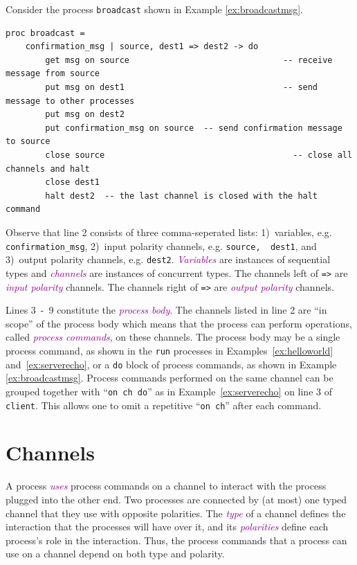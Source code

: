 \documentclass[11pt]{article}
\newcommand{\tc}[1]{\textcolor{darkMagenta}{\textit{#1}}}
\begin{document}
Consider the process \lstinline$broadcast$ shown in Example \ref{ex:broadcastmsg}.
\begin{lstlisting}[label=ex:broadcastmsg, caption=Process that broadcasts a message from a single source] 
proc broadcast =
	confirmation_msg | source, dest1 => dest2 -> do
		get msg on source								-- receive message from source
		put msg on dest1								-- send message to other processes
		put msg on dest2
		put confirmation_msg on source	-- send confirmation message to source
		close source									  -- close all channels and halt
		close dest1
		halt dest2  -- the last channel is closed with the halt command
\end{lstlisting}
Observe that line 2 consists of three comma-seperated lists: 1)~variables, e.g. \lstinline$confirmation_msg$, 2)~input polarity channels, e.g. \lstinline$source,  dest1$, and 3)~output polarity channels, e.g. \lstinline$dest2$.
\tc{Variables} are instances of sequential types and \tc{channels} are instances of concurrent types.
The channels left of \lstinline$=>$ are \tc{input polarity} channels.
The channels right of \lstinline$=>$ are \tc{output polarity} channels.

Lines 3~-~9 constitute the \tc{process body}.
The channels listed in line 2 are ``in scope'' of the process body which means that the process can perform operations, called \tc{process commands}, on these channels.
The process body may be a single process command, as shown in the \lstinline$run$ processes in Examples~\ref{ex:helloworld} and~\ref{ex:serverecho}, or a \lstinline$do$ block of process commands, as shown in Example \ref{ex:broadcastmsg}.
Process commands performed on the same channel can be grouped together with ``\lstinline$on ch do$'' as in Example~\ref{ex:serverecho} on line 3 of \lstinline$client$.
This allows one to omit a repetitive ``\lstinline$on ch$'' after each command.






\section{Channels}
\label{Sec:Channels}

A process \tc{uses} process commands on a channel to interact with the process plugged into the other end. 
Two processes are connected by (at most) one typed channel that they use with opposite polarities. 
The \tc{type} of a channel defines the interaction that the processes will have over it, and its \tc{polarities} define each process's role in the interaction. 
Thus, the process commands that a process can use on a channel depend on both type and polarity.
\end{document}
